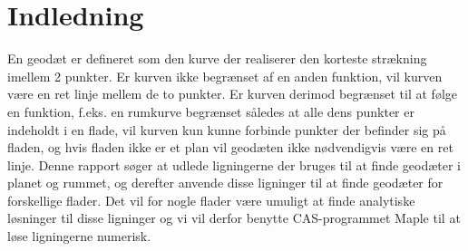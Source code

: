 \section{Indledning}
En geodæt er defineret som den kurve der realiserer den korteste strækning imellem 2 punkter. Er kurven ikke begrænset af en anden funktion, vil kurven være en ret linje mellem de to punkter. Er kurven derimod begrænset til at følge en funktion, f.eks. en rumkurve begrænset således at alle dens punkter er indeholdt i en flade, vil kurven kun kunne forbinde punkter der befinder sig på fladen, og hvis fladen ikke er et plan vil geodæten ikke nødvendigvis være en ret linje. Denne rapport søger at udlede ligningerne der bruges til at finde geodæter i planet og rummet, og derefter anvende disse ligninger til at finde geodæter for forskellige flader. Det vil for nogle flader være umuligt at finde analytiske løsninger til disse ligninger og vi vil derfor benytte CAS-programmet Maple til at løse ligningerne numerisk.